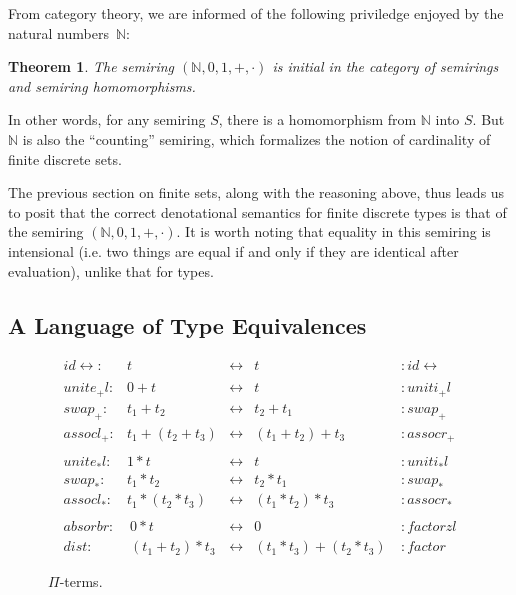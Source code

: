 \documentclass{article}
\newcommand{\identlp}{\mathit{unite}_+\mathit{l}}
\newcommand{\identrp}{\mathit{uniti}_+\mathit{l}}
\newcommand{\swapp}{\mathit{swap}_+}
\newcommand{\assoclp}{\mathit{assocl}_+}
\newcommand{\assocrp}{\mathit{assocr}_+}
\newcommand{\identlt}{\mathit{unite}_*\mathit{l}}
\newcommand{\identrt}{\mathit{uniti}_*\mathit{l}}
\newcommand{\swapt}{\mathit{swap}_*}
\newcommand{\assoclt}{\mathit{assocl}_*}
\newcommand{\assocrt}{\mathit{assocr}_*}
\newcommand{\factorzl}{\mathit{factorzl}}
\newcommand{\dist}{\mathit{dist}}
\newcommand{\factor}{\mathit{factor}}
\newcommand{\distz}{\mathit{absorbr}}
\newcommand{\iso}{\leftrightarrow}
\newcommand{\idc}{\mathit{id}\!\!\leftrightarrow}
\newtheorem{thm}{Theorem}[section]
\newcommand{\Nat}{\ensuremath{\mathbb{N}}}
\begin{document}
From category theory, we are informed of the following priviledge
enjoyed by the natural numbers~$\Nat$:
\begin{thm}
The semiring $\left(\Nat, 0, 1, +, \cdot\right)$ is \emph{initial}
in the category of semirings and semiring homomorphisms.
\end{thm}
\noindent In other words, for any semiring $S$, there is a homomorphism
from $\Nat$ into $S$. But $\Nat$ is also the ``counting'' semiring,
which formalizes the notion of cardinality of finite discrete sets.

The previous section on finite sets, along with the reasoning above,
thus leads us to posit that the correct denotational semantics for
finite discrete types is that of the semiring
$\left(\Nat, 0, 1, +, \cdot\right)$. It is worth noting that equality
in this semiring is intensional (i.e. two things are equal if and only if
they are identical after evaluation), unlike that for types.

\subsection{A Language of Type Equivalences} 

\begin{figure}[t]
\[
\begin{array}{rrcll}
\idc :& t & \iso & t &: \idc \\
\\
\identlp :&  0 + t & \iso & t &: \identrp \\
\swapp :&  t_1 + t_2 & \iso & t_2 + t_1 &: \swapp \\
\assoclp :&  t_1 + (t_2 + t_3) & \iso & (t_1 + t_2) + t_3 &: \assocrp \\
\\
\identlt :&  1 * t & \iso & t &: \identrt \\
\swapt :&  t_1 * t_2 & \iso & t_2 * t_1 &: \swapt \\
\assoclt :&  t_1 * (t_2 * t_3) & \iso & (t_1 * t_2) * t_3 &: \assocrt \\
\\
\distz :&~ 0 * t & \iso & 0 ~ &: \factorzl \\
\dist :&~ (t_1 + t_2) * t_3 & \iso & (t_1 * t_3) + (t_2 * t_3)~ &: \factor
\end{array}
\]
\caption{$\Pi$-terms.}
\label{pi-terms}
\end{figure}
\end{document}
